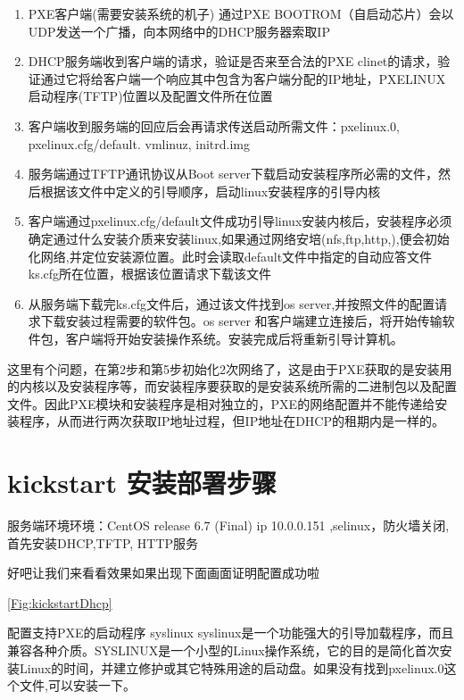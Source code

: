 \begin{enumerate}
\item PXE客户端(需要安装系统的机子) 通过PXE BOOTROM（自启动芯片）会以UDP发送一个广播，向本网络中的DHCP服务器索取IP
\item DHCP服务端收到客户端的请求，验证是否来至合法的PXE clinet的请求，验证通过它将给客户端一个响应其中包含为客户端分配的IP地址，PXELINUX启动程序(TFTP)位置以及配置文件所在位置
\item 客户端收到服务端的回应后会再请求传送启动所需文件：pxelinux.0, pxelinux.cfg/default. vmlinuz, initrd.img
\item 服务端通过TFTP通讯协议从Boot server下载启动安装程序所必需的文件，然后根据该文件中定义的引导顺序，启动linux安装程序的引导内核
\item 客户端通过pxelinux.cfg/default文件成功引导linux安装内核后，安装程序必须确定通过什么安装介质来安装linux,如果通过网络安培(nfs,ftp,http,),便会初始化网络,并定位安装源位置。此时会读取default文件中指定的自动应答文件ks.cfg所在位置，根据该位置请求下载该文件
\item 从服务端下载完ks.cfg文件后，通过该文件找到os server,并按照文件的配置请求下载安装过程需要的软件包。os server 和客户端建立连接后，将开始传输软件包，客户端将开始安装操作系统。安装完成后将重新引导计算机。
\end{enumerate}

这里有个问题，在第2步和第5步初始化2次网络了，这是由于PXE获取的是安装用的内核以及安装程序等，而安装程序要获取的是安装系统所需的二进制包以及配置文件。因此PXE模块和安装程序是相对独立的，PXE的网络配置并不能传递给安装程序，从而进行两次获取IP地址过程，但IP地址在DHCP的租期内是一样的。

\section{kickstart 安装部署步骤}
服务端环境环境：CentOS release 6.7 (Final)  ip 10.0.0.151 ,selinux，防火墙关闭, 首先安装DHCP,TFTP, HTTP服务



好吧让我们来看看效果如果出现下面画面证明配置成功啦

\ref{Fig:kickstartDhcp}

配置支持PXE的启动程序 syslinux
syslinux是一个功能强大的引导加载程序，而且兼容各种介质。SYSLINUX是一个小型的Linux操作系统，它的目的是简化首次安装Linux的时间，并建立修护或其它特殊用途的启动盘。如果没有找到pxelinux.0这个文件,可以安装一下。



